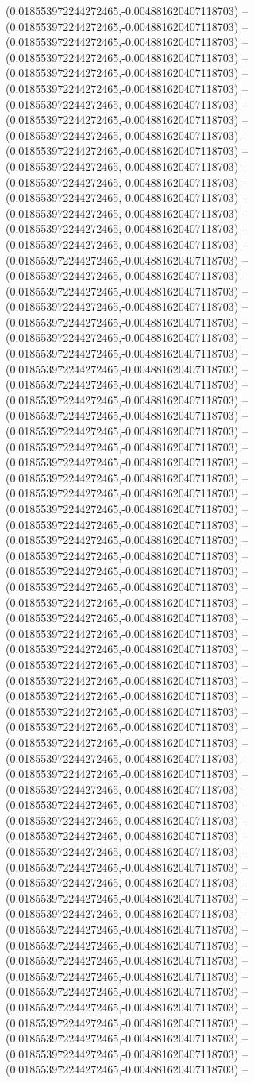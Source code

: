 (0.018553972244272465,-0.004881620407118703) -- (0.018553972244272465,-0.004881620407118703) -- (0.018553972244272465,-0.004881620407118703) -- (0.018553972244272465,-0.004881620407118703) -- (0.018553972244272465,-0.004881620407118703) -- (0.018553972244272465,-0.004881620407118703) -- (0.018553972244272465,-0.004881620407118703) -- (0.018553972244272465,-0.004881620407118703) -- (0.018553972244272465,-0.004881620407118703) -- (0.018553972244272465,-0.004881620407118703) -- (0.018553972244272465,-0.004881620407118703) -- (0.018553972244272465,-0.004881620407118703) -- (0.018553972244272465,-0.004881620407118703) -- (0.018553972244272465,-0.004881620407118703) -- (0.018553972244272465,-0.004881620407118703) -- (0.018553972244272465,-0.004881620407118703) -- (0.018553972244272465,-0.004881620407118703) -- (0.018553972244272465,-0.004881620407118703) -- (0.018553972244272465,-0.004881620407118703) -- (0.018553972244272465,-0.004881620407118703) -- (0.018553972244272465,-0.004881620407118703) -- (0.018553972244272465,-0.004881620407118703) -- (0.018553972244272465,-0.004881620407118703) -- (0.018553972244272465,-0.004881620407118703) -- (0.018553972244272465,-0.004881620407118703) -- (0.018553972244272465,-0.004881620407118703) -- (0.018553972244272465,-0.004881620407118703) -- (0.018553972244272465,-0.004881620407118703) -- (0.018553972244272465,-0.004881620407118703) -- (0.018553972244272465,-0.004881620407118703) -- (0.018553972244272465,-0.004881620407118703) -- (0.018553972244272465,-0.004881620407118703) -- (0.018553972244272465,-0.004881620407118703) -- (0.018553972244272465,-0.004881620407118703) -- (0.018553972244272465,-0.004881620407118703) -- (0.018553972244272465,-0.004881620407118703) -- (0.018553972244272465,-0.004881620407118703) -- (0.018553972244272465,-0.004881620407118703) -- (0.018553972244272465,-0.004881620407118703) -- (0.018553972244272465,-0.004881620407118703) -- (0.018553972244272465,-0.004881620407118703) -- (0.018553972244272465,-0.004881620407118703) -- (0.018553972244272465,-0.004881620407118703) -- (0.018553972244272465,-0.004881620407118703) -- (0.018553972244272465,-0.004881620407118703) -- (0.018553972244272465,-0.004881620407118703) -- (0.018553972244272465,-0.004881620407118703) -- (0.018553972244272465,-0.004881620407118703) -- (0.018553972244272465,-0.004881620407118703) -- (0.018553972244272465,-0.004881620407118703) -- (0.018553972244272465,-0.004881620407118703) -- (0.018553972244272465,-0.004881620407118703) -- (0.018553972244272465,-0.004881620407118703) -- (0.018553972244272465,-0.004881620407118703) -- (0.018553972244272465,-0.004881620407118703) -- (0.018553972244272465,-0.004881620407118703) -- (0.018553972244272465,-0.004881620407118703) -- (0.018553972244272465,-0.004881620407118703) -- (0.018553972244272465,-0.004881620407118703) -- (0.018553972244272465,-0.004881620407118703) -- (0.018553972244272465,-0.004881620407118703) -- (0.018553972244272465,-0.004881620407118703) -- (0.018553972244272465,-0.004881620407118703) -- (0.018553972244272465,-0.004881620407118703) -- (0.018553972244272465,-0.004881620407118703) -- (0.018553972244272465,-0.004881620407118703) -- (0.018553972244272465,-0.004881620407118703) -- (0.018553972244272465,-0.004881620407118703) -- (0.018553972244272465,-0.004881620407118703) -- 